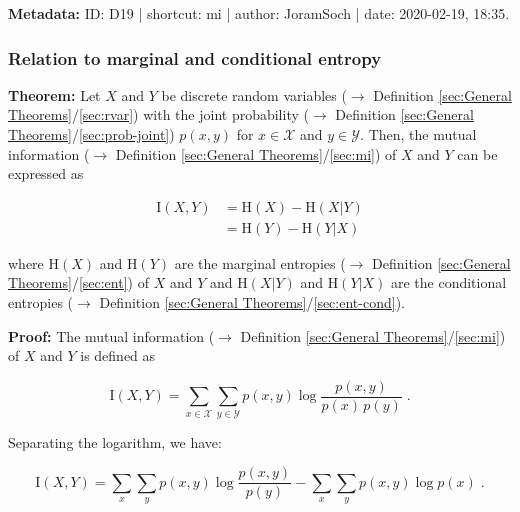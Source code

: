 \documentclass[a4paper,12pt,twoside]{book}
\begin{document}
\vspace{1em}
\textbf{Metadata:} ID: D19 | shortcut: mi | author: JoramSoch | date: 2020-02-19, 18:35.
\vspace{1em}



\subsubsection[\textbf{Relation to marginal and conditional entropy}]{Relation to marginal and conditional entropy} \label{sec:dmi-mce}
\setcounter{equation}{0}

\textbf{Theorem:} Let $X$ and $Y$ be discrete random variables ($\rightarrow$ Definition \ref{sec:General Theorems}/\ref{sec:rvar}) with the joint probability ($\rightarrow$ Definition \ref{sec:General Theorems}/\ref{sec:prob-joint}) $p(x,y)$ for $x \in \mathcal{X}$ and $y \in \mathcal{Y}$. Then, the mutual information ($\rightarrow$ Definition \ref{sec:General Theorems}/\ref{sec:mi}) of $X$ and $Y$ can be expressed as

\begin{equation} \label{eq:dmi-mce-dmi-mce}
\begin{split}
\mathrm{I}(X,Y) &= \mathrm{H}(X) - \mathrm{H}(X|Y) \\
&= \mathrm{H}(Y) - \mathrm{H}(Y|X)
\end{split}
\end{equation}

where $\mathrm{H}(X)$ and $\mathrm{H}(Y)$ are the marginal entropies ($\rightarrow$ Definition \ref{sec:General Theorems}/\ref{sec:ent}) of $X$ and $Y$ and $\mathrm{H}(X \vert Y)$ and $\mathrm{H}(Y \vert X)$ are the conditional entropies ($\rightarrow$ Definition \ref{sec:General Theorems}/\ref{sec:ent-cond}).


\vspace{1em}
\textbf{Proof:} The mutual information ($\rightarrow$ Definition \ref{sec:General Theorems}/\ref{sec:mi}) of $X$ and $Y$ is defined as

\begin{equation} \label{eq:dmi-mce-MI}
\mathrm{I}(X,Y) = \sum_{x \in \mathcal{X}} \sum_{y \in \mathcal{Y}} p(x,y) \log \frac{p(x,y)}{p(x)\,p(y)} \; .
\end{equation}

Separating the logarithm, we have:

\begin{equation} \label{eq:dmi-mce-MI-s1}
\mathrm{I}(X,Y) = \sum_x \sum_y p(x,y) \log \frac{p(x,y)}{p(y)} - \sum_x \sum_y p(x,y) \log p(x) \; .
\end{equation}
\end{document}
